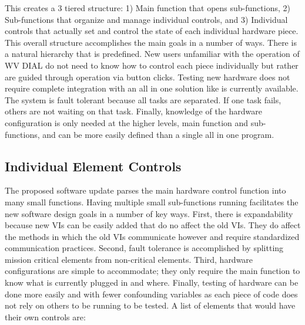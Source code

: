 This creates a 3 tiered structure: 1) Main function that opens sub-functions, 2) Sub-functions that organize and manage individual controls, and 3) Individual controls that actually set and control the state of each individual hardware piece. This overall structure accomplishes the main goals in a number of ways. There is a natural hierarchy that is predefined. New users unfamiliar with the operation of WV DIAL do not need to know how to control each piece individually but rather are guided through operation via button clicks. Testing new hardware does not require complete integration with an all in one solution like is currently available. The system is fault tolerant because all tasks are separated. If one task fails, others are not waiting on that task. Finally, knowledge of the hardware configuration is only needed at the higher levels, main function and sub-functions, and can be more easily defined than a single all in one program. 

\subsection{Individual Element Controls}
The proposed software update parses the main hardware control function into many small functions. Having multiple small sub-functions running facilitates the new software design goals in a number of key ways. First, there is expandability because new VIs can be easily added that do no affect the old VIs. They do affect the methods in which the old VIs communicate however and require standardized communication practices. Second, fault tolerance is accomplished by splitting mission critical elements from non-critical elements. Third, hardware configurations are simple to accommodate; they only require the main function to know what is currently plugged in and where. Finally, testing of hardware can be done more easily and with fewer confounding variables as each piece of code does not rely on others to be running to be tested. A list of elements that would have their own controls are:

